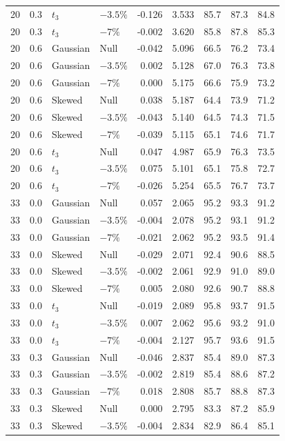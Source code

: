 \begin{longtable}{rrllrrrrr}
20 & 0.3 & $t_3$ & $-3.5\%$ & -0.126 & 3.533 & 85.7 & 87.3 & 84.8 \\
20 & 0.3 & $t_3$ & $-7\%$ & -0.002 & 3.620 & 85.8 & 87.8 & 85.3 \\
20 & 0.6 & Gaussian & Null & -0.042 & 5.096 & 66.5 & 76.2 & 73.4 \\
20 & 0.6 & Gaussian & $-3.5\%$ & 0.002 & 5.128 & 67.0 & 76.3 & 73.8 \\
20 & 0.6 & Gaussian & $-7\%$ & 0.000 & 5.175 & 66.6 & 75.9 & 73.2 \\
20 & 0.6 & Skewed & Null & 0.038 & 5.187 & 64.4 & 73.9 & 71.2 \\
20 & 0.6 & Skewed & $-3.5\%$ & -0.043 & 5.140 & 64.5 & 74.3 & 71.5 \\
20 & 0.6 & Skewed & $-7\%$ & -0.039 & 5.115 & 65.1 & 74.6 & 71.7 \\
20 & 0.6 & $t_3$ & Null & 0.047 & 4.987 & 65.9 & 76.3 & 73.5 \\
20 & 0.6 & $t_3$ & $-3.5\%$ & 0.075 & 5.101 & 65.1 & 75.8 & 72.7 \\
20 & 0.6 & $t_3$ & $-7\%$ & -0.026 & 5.254 & 65.5 & 76.7 & 73.7 \\
33 & 0.0 & Gaussian & Null & 0.057 & 2.065 & 95.2 & 93.3 & 91.2 \\
33 & 0.0 & Gaussian & $-3.5\%$ & -0.004 & 2.078 & 95.2 & 93.1 & 91.2 \\
33 & 0.0 & Gaussian & $-7\%$ & -0.021 & 2.062 & 95.2 & 93.5 & 91.4 \\
33 & 0.0 & Skewed & Null & -0.029 & 2.071 & 92.4 & 90.6 & 88.5 \\
33 & 0.0 & Skewed & $-3.5\%$ & -0.002 & 2.061 & 92.9 & 91.0 & 89.0 \\
33 & 0.0 & Skewed & $-7\%$ & 0.005 & 2.080 & 92.6 & 90.7 & 88.8 \\
33 & 0.0 & $t_3$ & Null & -0.019 & 2.089 & 95.8 & 93.7 & 91.5 \\
33 & 0.0 & $t_3$ & $-3.5\%$ & 0.007 & 2.062 & 95.6 & 93.2 & 91.0 \\
33 & 0.0 & $t_3$ & $-7\%$ & -0.004 & 2.127 & 95.7 & 93.6 & 91.5 \\
33 & 0.3 & Gaussian & Null & -0.046 & 2.837 & 85.4 & 89.0 & 87.3 \\
33 & 0.3 & Gaussian & $-3.5\%$ & -0.002 & 2.819 & 85.4 & 88.6 & 87.2 \\
33 & 0.3 & Gaussian & $-7\%$ & 0.018 & 2.808 & 85.7 & 88.8 & 87.3 \\
33 & 0.3 & Skewed & Null & 0.000 & 2.795 & 83.3 & 87.2 & 85.9 \\
33 & 0.3 & Skewed & $-3.5\%$ & -0.004 & 2.834 & 82.9 & 86.4 & 85.1 \\

\end{longtable}
